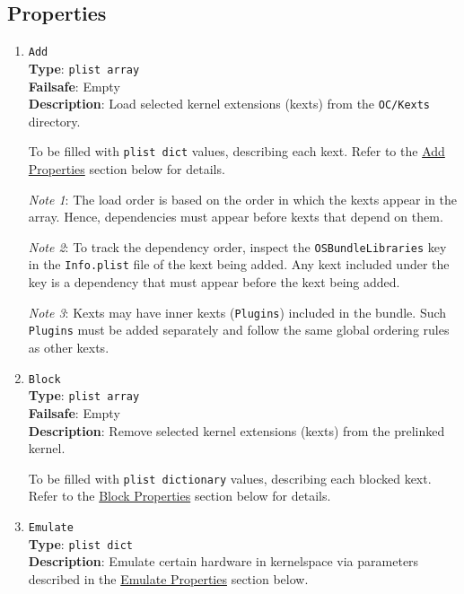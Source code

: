 \documentclass[]{article}
\makeatletter
\renewcommand{\label}[1]{%
\zref@wrapper@immediate{\oldlabel{#1}}}  %
\makeatother
\begin{document}
\subsection{Properties}\label{kernelprops}

\begin{enumerate}

\item
  \texttt{Add}\\
  \textbf{Type}: \texttt{plist\ array}\\
  \textbf{Failsafe}: Empty\\
  \textbf{Description}: Load selected kernel extensions (kexts) from the \texttt{OC/Kexts} directory.

  To be filled with \texttt{plist\ dict} values, describing each kext. Refer to
  the \hyperref[kernelpropsadd]{Add Properties} section below for details.

  \emph{Note 1}: The load order is based on the order in which the kexts appear in
  the array. Hence, dependencies must appear before kexts that depend on them.

  \emph{Note 2}: To track the dependency order, inspect the \texttt{OSBundleLibraries}
  key in the \texttt{Info.plist} file of the kext being added. Any kext included
  under the key is a dependency that must appear before the kext being added.

  \emph{Note 3}: Kexts may have inner kexts (\texttt{Plugins}) included in the bundle.
  Such \texttt{Plugins} must be added separately and follow the same global ordering
  rules as other kexts.

\item
  \texttt{Block}\\
  \textbf{Type}: \texttt{plist\ array}\\
  \textbf{Failsafe}: Empty\\
  \textbf{Description}: Remove selected kernel extensions (kexts) from the prelinked kernel.

  To be filled with \texttt{plist\ dictionary} values, describing each blocked kext.
  Refer to the \hyperref[kernelpropsblock]{Block Properties} section below for details.

\item
  \texttt{Emulate}\\
  \textbf{Type}: \texttt{plist\ dict}\\
  \textbf{Description}: Emulate certain hardware in kernelspace via parameters
  described in the \hyperref[kernelpropsemu]{Emulate Properties} section below.


\end{enumerate}
\end{document}
